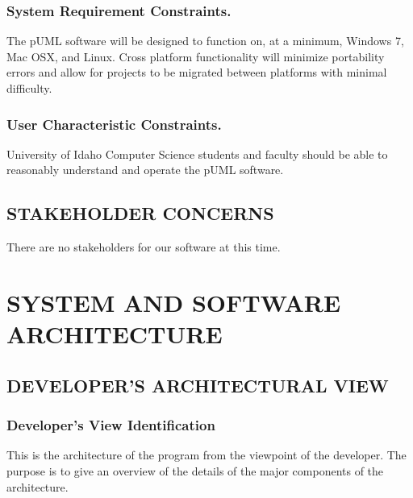\documentclass[twoside,letterpaper]{article}
\begin{document}
{\subsubsection{System Requirement Constraints.}
{\color{black}
The pUML software will be designed to function on, at a minimum, Windows 7, Mac OSX, and Linux.  Cross platform functionality will minimize portability errors and allow for projects to be migrated between platforms with minimal difficulty.
}

\subsubsection{User Characteristic Constraints.}
{\color{black}
University of Idaho Computer Science students and faculty should be able
to reasonably understand and operate the pUML software.
}

\subsection[STAKEHOLDER CONCERNS]
{\bfseries\color{black} STAKEHOLDER CONCERNS}
{\color{black}
There are no stakeholders for our software at this time.
}


\bigskip





\clearpage\setcounter{page}{1}\pagestyle{Convertvi}
\section[SYSTEM AND SOFTWARE
ARCHITECTURE]{\bfseries\color{black} SYSTEM AND
SOFTWARE ARCHITECTURE}

\subsection[DEVELOPER{\textquoteright}S ARCHITECTURAL
VIEW]{\bfseries\color{black}
DEVELOPER{\textquoteright}S ARCHITECTURAL VIEW}

\subsubsection[Developer{\textquoteright}s View
Identification]{\bfseries\color{black}
Developer{\textquoteright}s View Identification}
{\color{black}
This is the architecture of the program from the viewpoint of the
developer. The purpose is to give an overview of the details of the major
components of the architecture.}

}
\end{document}
